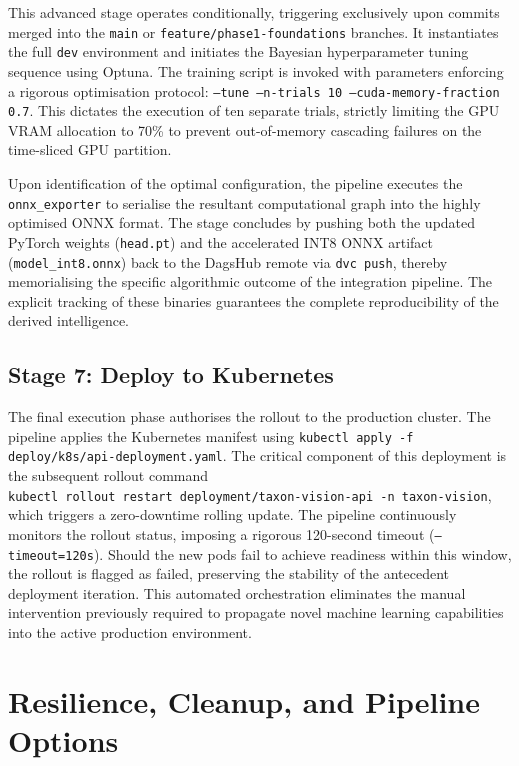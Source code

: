 This advanced stage operates conditionally, triggering exclusively upon commits merged into the \texttt{main} or \texttt{feature/phase1-foundations} branches. It instantiates the full \texttt{dev} environment and initiates the Bayesian hyperparameter tuning sequence using Optuna. The training script is invoked with parameters enforcing a rigorous optimisation protocol: \texttt{--tune --n-trials 10 --cuda-memory-fraction 0.7}. This dictates the execution of ten separate trials, strictly limiting the GPU VRAM allocation to 70\% to prevent out-of-memory cascading failures on the time-sliced GPU partition.

Upon identification of the optimal configuration, the pipeline executes the \texttt{onnx\_exporter} to serialise the resultant computational graph into the highly optimised ONNX format. The stage concludes by pushing both the updated PyTorch weights (\texttt{head.pt}) and the accelerated INT8 ONNX artifact (\texttt{model\_int8.onnx}) back to the DagsHub remote via \texttt{dvc push}, thereby memorialising the specific algorithmic outcome of the integration pipeline. The explicit tracking of these binaries guarantees the complete reproducibility of the derived intelligence.

\subsection{Stage 7: Deploy to Kubernetes}

The final execution phase authorises the rollout to the production cluster. The pipeline applies the Kubernetes manifest using \texttt{kubectl apply -f deploy/k8s/api-deployment.yaml}. The critical component of this deployment is the subsequent rollout command\\\texttt{kubectl rollout restart deployment/taxon-vision-api -n taxon-vision}, which triggers a zero-downtime rolling update. The pipeline continuously monitors the rollout status, imposing a rigorous 120-second timeout (\texttt{--timeout=120s}). Should the new pods fail to achieve readiness within this window, the rollout is flagged as failed, preserving the stability of the antecedent deployment iteration. This automated orchestration eliminates the manual intervention previously required to propagate novel machine learning capabilities into the active production environment.

\section{Resilience, Cleanup, and Pipeline Options}
\label{sec:resilience_cleanup}

